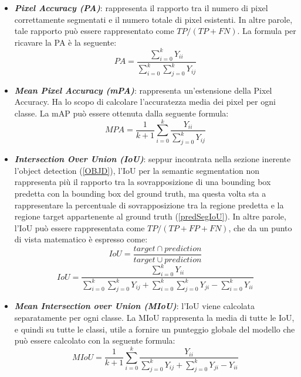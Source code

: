 \begin{itemize}
    \item {\bfseries{\emph{Pixel Accuracy (PA)}}}: rappresenta il rapporto tra il numero di pixel 
    correttamente segmentati e il numero totale di pixel esistenti. In altre parole, tale 
    rapporto può essere rappresentato come $TP/(TP+FN)$. La formula per 
    ricavare la PA è la seguente:
    \begin{equation}
        PA = \frac{\sum_{i=0}^kY_{ii}}{\sum_{i=0}^k\sum_{j=0}^kY_{ij}}
    \end{equation}

    \item {\bfseries{\emph{Mean Pixel Accuracy (mPA)}}}: rappresenta un'estensione della Pixel 
    Accuracy. Ha lo scopo di calcolare l'accuratezza media dei pixel per ogni 
    classe. La mAP può essere ottenuta dalla seguente formula:
    \begin{equation}
        MPA = \frac{1}{k+1}\sum_{i=0}^k\frac{Y_{ii}}{\sum_{j=0}^kY_{ij}}
    \end{equation}

    \item {\bfseries{\emph{Intersection Over Union (IoU)}}}: seppur incontrata nella sezione inerente 
    l'object detection (\ref{OBJD}), l'IoU per la semantic segmentation non rappresenta 
    più il rapporto tra la sovrapposizione di una bounding box predetta con 
    la bounding box del ground truth, ma questa volta sta a rappresentare la 
    percentuale di sovrapposizione tra la regione predetta e la regione target 
    appartenente al ground truth (\ref{predSegIoU}). In altre parole, l'IoU può essere rappresentata 
    come $TP/(TP+FP+FN)$, che da un punto di vista matematico è espresso come:
    \begin{equation}\label{predSegIoU}
        IoU = \frac{target\cap prediction}{target\cup prediction}
    \end{equation}
    \begin{equation}
        IoU = \frac{\sum_{i=0}^kY_{ii}}{\sum_{i=0}^k\sum_{j=0}^kY_{ij}+\sum_{i=0}^k\sum_{j=0}^kY_{ji}-\sum_{i=0}^kY_{ii}}
    \end{equation}

    \item {\bfseries{\emph{Mean Intersection over Union (MIoU)}}}: l'IoU viene calcolata separatamente 
    per ogni classe. La MIoU rappresenta la media di tutte le IoU, e 
    quindi su tutte le classi, utile a fornire un punteggio globale del modello che 
    può essere calcolato con la seguente formula:
    \begin{equation}
        MIoU = \frac{1}{k+1}\sum_{i=0}^k\frac{Y_{ii}}{\sum_{j=0}^kY_{ij}+\sum_{j=0}^kY_{ji}-Y_{ii}}
    \end{equation}


\end{itemize}
